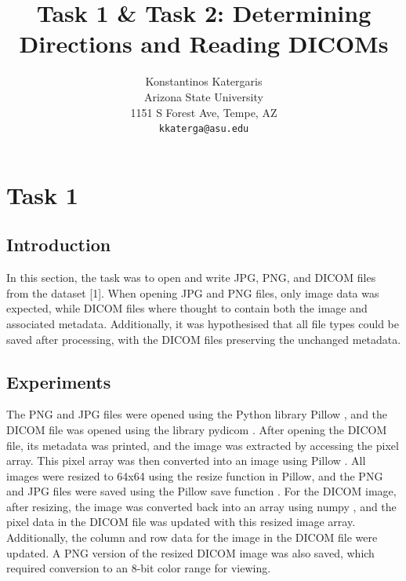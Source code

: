 \documentclass[10pt,twocolumn,letterpaper]{article}
\begin{document}
\title{Task 1 \& Task 2: Determining Directions and Reading DICOMs}

\author{Konstantinos Katergaris\\
Arizona State University\\
1151 S Forest Ave, Tempe, AZ\\
{\tt\small kkaterga@asu.edu}}


\maketitle

\section{Task 1}

\subsection{Introduction}
In this section, the task was to open and write JPG, PNG, and DICOM files from the dataset [1]. When opening JPG and PNG files, only image data was expected, while DICOM files where thought to contain both the image and associated metadata. Additionally, it was hypothesised that all file types could be saved after processing, with the DICOM files preserving the unchanged metadata.

\subsection{Experiments}
The PNG and JPG files were opened using the Python library Pillow \cite{PydicomDocumentation}, and the DICOM file was opened using the library pydicom \cite{PecoDICOM}. After opening the DICOM file, its metadata was printed, and the image was extracted by accessing the pixel array. This pixel array was then converted into an image using Pillow \cite{PillowFromArray}. All images were resized to 64x64 using the resize function \cite{PillowResize} in Pillow, and the PNG and JPG files were saved using the Pillow save function \cite{PillowSave}. For the DICOM image, after resizing, the image was converted back into an array using numpy \cite{NumpyArray}, and the pixel data in the DICOM file was updated with this resized image array. Additionally, the column and row data for the image in the DICOM file were updated. A PNG version of the resized DICOM image was also saved, which required conversion to an 8-bit color range for viewing.
\end{document}
